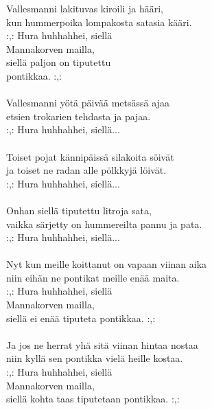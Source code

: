 
            Vallesmanni lakituvas kiroili ja hääri, \\
            kun hummerpoika lompakosta satasia kääri. \\
            :,: Hura huhhahhei, siellä \\
            Mannakorven mailla, \\
            siellä paljon on tiputettu \\
            pontikkaa. :,: \\
\hspace{10mm} \\
            Vallesmanni yötä päivää metsässä ajaa \\
            etsien trokarien tehdasta ja pajaa. \\
            :,: Hura huhhahhei, siellä... \\
\hspace{10mm} \\
            Toiset pojat kännipäissä silakoita söivät \\
            ja toiset ne radan alle pölkkyjä löivät. \\
            :,: Hura huhhahhei, siellä... \\
\hspace{10mm} \\
            Onhan siellä tiputettu litroja sata, \\
            vaikka särjetty on hummereilta pannu ja pata. \\
            :,: Hura huhhahhei, siellä... \\
\hspace{10mm} \\
            Nyt kun meille koittanut on vapaan viinan aika \\
            niin eihän ne pontikat meille enää maita. \\
            :,: Hura huhhahhei, siellä \\
            Mannakorven mailla, \\
            siellä ei enää tiputeta pontikkaa. :,: \\
\hspace{10mm} \\
            Ja jos ne herrat yhä sitä viinan hintaa nostaa \\
            niin kyllä sen pontikka vielä heille kostaa. \\
            :,: Hura huhhahhei, siellä \\
            Mannakorven mailla, \\
            siellä kohta taas tiputetaan pontikkaa. :,: \\

